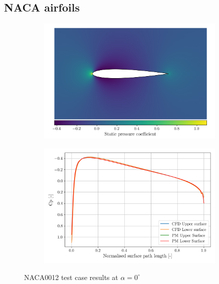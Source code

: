 \documentclass{article}
\begin{document}
\subsection{NACA airfoils}

\begin{figure}[H]
    \centering
    \begin{subfigure}{0.49\textwidth}
        \centering
        \includegraphics[width=0.99\textwidth]{figures/naca0012_cp_0.0}
        \caption{}
        \label{fig:naca0012_cp}
    \end{subfigure}
    \begin{subfigure}{0.49\textwidth}
        \centering
        \includegraphics[width=0.99\textwidth]{figures/naca0012_surface_cp_0.0.png}
        \caption{}
        \label{fig:naca0012_surface_cp}
    \end{subfigure}
    \caption{NACA0012 test case results at $\alpha = 0^\circ$}
\end{figure}
\end{document}
